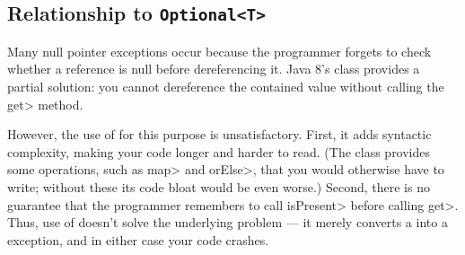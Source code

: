 %
%
%
%
%
%
%


\subsection{Relationship to \tt{Optional<T>}\label{nullness-vs-optional}}

Many null pointer exceptions occur because the programmer forgets to check
whether a reference is null before dereferencing it.  Java 8's
class provides a partial solution:  you cannot
dereference the contained value without calling the \<get> method.

However, the use of  for this purpose is unsatisfactory.
First, it adds syntactic complexity, making your code longer and harder to
read.  (The  class provides some operations, such as \<map>
and \<orElse>, that you would otherwise have to write; without these its
code bloat would be even worse.)  Second, there is no guarantee that the
programmer remembers to call \<isPresent> before calling \<get>.  Thus, use
of  doesn't solve the underlying problem --- it merely
converts a  into a
 exception, and in either case your code
crashes.

